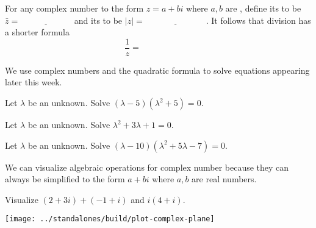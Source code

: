 \documentclass[../main.tex]{subfiles}
\begin{document}
For any complex number \underline{\hspace{1in}} to the form \(z = a + bi\) where \(a,b\) are \underline{\hspace{3cm}}, define its  to be \(\bar{z} = \underline{\hspace{1in}}\) and its  to be \(|z| = \underline{\hspace{3cm}}\).  It follows that division has a shorter formula
\[
  \frac{1}{z} = \hspace{1in}
\]

\faStar{} We use complex numbers and the quadratic formula to solve equations appearing later this week.
\begin{example}
  Let \(\lambda\) be an unknown. Solve \((\lambda - 5) (\lambda^{2} + 5) = 0\).
\end{example}

\begin{example}
  Let \(\lambda\) be an unknown. Solve \(\lambda^{2} + 3\lambda + 1 = 0\).
\end{example}

\begin{example}
  Let \(\lambda\) be an unknown. Solve \((\lambda - 10) (\lambda^{2} + 5\lambda - 7) = 0\).
\end{example}

We can visualize algebraic operations for complex number because they can always be simplified to the form \(a + bi\) where \(a,b\) are real numbers.

\begin{example}
  Visualize \((2 + 3i) + (-1 + i)\) and \(i (4 + i)\).

  \texttt{[image: ../standalones/build/plot-complex-plane]}
\end{example}
\end{document}
